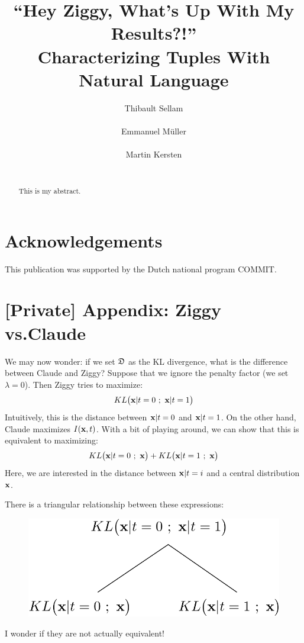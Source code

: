\documentclass{sig-alternate-2013}
\newcommand{\mf}{\ensuremath{\mathfrak}}
\newcommand{\rb}{\ensuremath{\mathbf}}
\begin{document}
\title{``Hey Ziggy, What's Up With My Results?!''\\
Characterizing Tuples With Natural Language}

\author{
\alignauthor
Thibault Sellam\\
       \\
\alignauthor
Emmanuel M\"uller\\
    \\
\alignauthor
Martin Kersten\\
       \\
}

\maketitle

\begin{abstract}
    This is my abstract.
\end{abstract}





\section{Acknowledgements}
This publication was supported by the Dutch national program COMMIT.




\section*{[Private] Appendix: Ziggy vs.Claude}
\label{zigvsclaude}
We may now wonder: if we set $\mf{D}$ as the KL divergence, what is the
difference between Claude and Ziggy?  Suppose that we ignore the penalty factor
(we set $\lambda=0$). Then Ziggy tries to maximize:
$$
KL\big(\rb{x} | t=0 \ ; \  \rb{x} | t=1 \big)
$$
Intuitively, this is the distance between $\rb{x} | t=0$ and $\rb{x} | t=1$.
On the other hand, Claude maximizes $I(\rb{x}, t)$. With a bit of playing
around, we can show that this is equivalent to maximizing:
$$
    KL\big(\rb{x} | t=0 \ ; \  \rb{x} \big) + 
        KL\big(\rb{x} | t=1 \ ; \  \rb{x} \big)
$$
Here, we are interested in the distance between $\rb{x} | t=i$ and a central
distribution $\rb{x}$. 

There is a triangular relationship between these expressions:
\begin{figure}[h!]
  \centering
  \includegraphics[width=0.6\columnwidth]{Figures/Triangle}
  \label{pic:triangle}
\end{figure}

I wonder if they are not actually equivalent!
\end{document}

